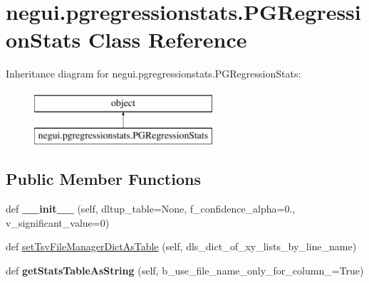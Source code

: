\hypertarget{classnegui_1_1pgregressionstats_1_1PGRegressionStats}{}\section{negui.\+pgregressionstats.\+P\+G\+Regression\+Stats Class Reference}
\label{classnegui_1_1pgregressionstats_1_1PGRegressionStats}
Inheritance diagram for negui.\+pgregressionstats.\+P\+G\+Regression\+Stats\+:\begin{figure}[H]
\begin{center}
\leavevmode
\includegraphics[height=2.000000cm]{classnegui_1_1pgregressionstats_1_1PGRegressionStats}
\end{center}
\end{figure}
\subsection*{Public Member Functions}
\begin{DoxyCompactItemize}
\item 
def {\bfseries \+\_\+\+\_\+init\+\_\+\+\_\+} (self, dltup\+\_\+table=None, f\+\_\+confidence\+\_\+alpha=0., v\+\_\+significant\+\_\+value=0)\hypertarget{classnegui_1_1pgregressionstats_1_1PGRegressionStats_ac6ad2a253d65e5fa5834a69c152fcf6f}{}\label{classnegui_1_1pgregressionstats_1_1PGRegressionStats_ac6ad2a253d65e5fa5834a69c152fcf6f}

\item 
def \hyperlink{classnegui_1_1pgregressionstats_1_1PGRegressionStats_af5b875de96042eb9c87fcf1396a8880f}{set\+Tsv\+File\+Manager\+Dict\+As\+Table} (self, dls\+\_\+dict\+\_\+of\+\_\+xy\+\_\+lists\+\_\+by\+\_\+line\+\_\+name)
\item 
def {\bfseries get\+Stats\+Table\+As\+String} (self, b\+\_\+use\+\_\+file\+\_\+name\+\_\+only\+\_\+for\+\_\+column\+\_=True)\hypertarget{classnegui_1_1pgregressionstats_1_1PGRegressionStats_a649eaf8155c4421fce659ea47fb7bdf2}{}\label{classnegui_1_1pgregressionstats_1_1PGRegressionStats_a649eaf8155c4421fce659ea47fb7bdf2}

\end{DoxyCompactItemize}



